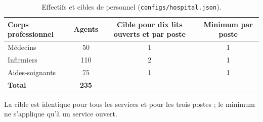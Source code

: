 \begin{table}[H]
    \centering
    \caption{Effectifs et cibles de personnel (\texttt{configs/hospital.json}).}
    \label{tab:effectifs}
    \small
    \begin{tabular}{lccc}
        \toprule
        \textbf{Corps professionnel} & \textbf{Agents} & \textbf{Cible pour dix lits ouverts et par poste} & \textbf{Minimum par poste} \\
        \midrule
        Médecins & 50 & 1 & 1 \\
        Infirmiers & 110 & 2 & 1 \\
        Aides-soignants & 75 & 1 & 1 \\
        \midrule
        \textbf{Total} & \textbf{235} &  &  \\
        \bottomrule
    \end{tabular}
    \par\vspace{3pt}
    {\footnotesize La cible est identique pour tous les services et pour les trois postes ; le minimum ne s'applique qu'à un service ouvert.}
\end{table}
